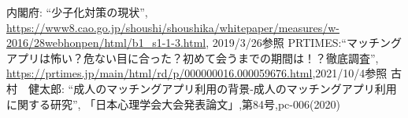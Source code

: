 \documentclass[twocolumn,10pt,a4j]{ltjsarticle}
\begin{document}
\begin{thebibliography}{99}
 内閣府: ``少子化対策の現状'', \url{https://www8.cao.go.jp/shoushi/shoushika/whitepaper/measures/w-2016/28webhonpen/html/b1_s1-1-3.html}, 2019/3/26参照
PRTIMES:``マッチングアプリは怖い？危ない目に合った？初めて会うまでの期間は！？徹底調査'',
\url{https://prtimes.jp/main/html/rd/p/000000016.000059676.html},2021/10/4参照
 古村　健太郎: ``成人のマッチングアプリ利用の背景-成人のマッチングアプリ利用に関する研究'', 「日本心理学会大会発表論文」,第84号,pc-006(2020)

\end{thebibliography}
\end{document}
